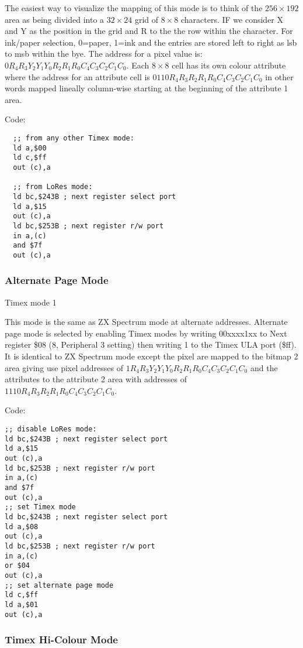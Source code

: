 The easiest way to visualize the mapping of this mode is to think of
the $256\times192$ area as being divided into a $32\times24$ grid of
$8\times8$ characters.  IF we consider X and Y as the position in the
grid and R to the the row within the character.  For ink/paper
selection, 0=paper, 1=ink and the entries are stored left to right as
lsb to msb within the bye.  The address for a pixel value is:
$0R_4R_3Y_2Y_1Y_0R_2R_1R_0C_4C_3C_2C_1C_0$. Each $8\times8$ cell has
its own colour attribute where the address for an attribute cell is
$0110R_4R_3R_2R_1R_0C_4C_3C_2C_1C_0$ in other words mapped lineally
column-wise starting at the beginning of the attribute 1 area.

Code:
\begin{verbatim}
  ;; from any other Timex mode:
  ld a,$00
  ld c,$ff
  out (c),a

  ;; from LoRes mode:
  ld bc,$243B ; next register select port
  ld a,$15
  out (c),a
  ld bc,$253B ; next register r/w port
  in a,(c)
  and $7f
  out (c),a
\end{verbatim}

\subsubsection{Alternate Page Mode}

Timex mode 1

This mode is the same as ZX Spectrum mode at alternate
addresses. Alternate page mode is selected by enabling Timex modes by
writing 00xxxx1xx to Next register \$08 (8, Peripheral 3 setting) then
writing 1 to the Timex ULA port (\$ff).  It is identical to ZX
Spectrum mode except the pixel are mapped to the bitmap 2 area giving
use pixel addresses of $1R_4R_3Y_2Y_1Y_0R_2R_1R_0C_4C_3C_2C_1C_0$ and
the attributes to the attribute 2 area with addresses of
$1110R_4R_3R_2R_1R_0C_4C_3C_2C_1C_0$.

Code:

\begin{verbatim}
;; disable LoRes mode:
ld bc,$243B ; next register select port
ld a,$15
out (c),a
ld bc,$253B ; next register r/w port
in a,(c)
and $7f
out (c),a
;; set Timex mode
ld bc,$243B ; next register select port
ld a,$08
out (c),a
ld bc,$253B ; next register r/w port
in a,(c)
or $04
out (c),a
;; set alternate page mode
ld c,$ff
ld a,$01
out (c),a
\end{verbatim}

\subsubsection{Timex Hi-Colour Mode}

